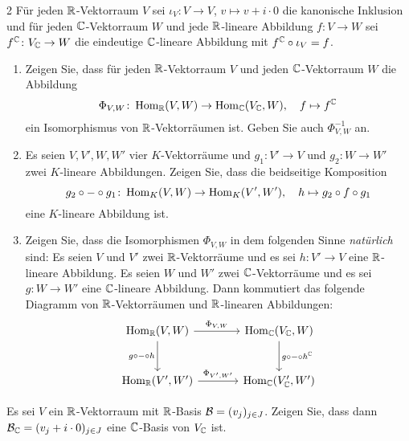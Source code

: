 

\begin{question}[subtitle = Komplexifizierung von Abbildungen und Natürlichkeit der Komplexifizierung]{2}
  Für jeden $\mathbb{R}$-Vektorraum $V$ sei $\iota_V \colon V \to V$, $v \mapsto v + i \cdot 0$ die kanonische Inklusion und für jeden $\mathbb{C}$-Vektorraum $W$ und jede $\mathbb{R}$-lineare Abbildung $f \colon V \to W$ sei $f^{\mathbb{C}} \colon V_{\mathbb{C}} \to W$ die eindeutige $\mathbb{C}$-lineare Abbildung mit $f^{\mathbb{C}} \circ \iota_V = f$.
  \begin{enumerate}[leftmargin=*]
    \item
      Zeigen Sie, dass für jeden $\mathbb{R}$-Vektorraum $V$ und jeden $\mathbb{C}$-Vektorraum $W$ die Abbildung
      \[
        \Phi_{V,W} \colon \operatorname{Hom}_{\mathbb{R}}(V, W) \to \operatorname{Hom}_{\mathbb{C}}(V_{\mathbb{C}}, W),
        \quad
        f \mapsto f^{\mathbb{C}}
      \]
      ein Isomorphismus von $\mathbb{R}$-Vektorräumen ist.
      Geben Sie auch $\Phi_{V,W}^{-1}$ an.
    \item
      Es seien  $V, V', W, W'$ vier $K$-Vektorräume und $g_1 \colon V' \to V$ und $g_2 \colon W \to W'$ zwei $K$-lineare Abbildungen.
      Zeigen Sie, dass die beidseitige Komposition
      \[
        g_2 \circ - \circ g_1
        \colon
        \operatorname{Hom}_K(V, W) \to \operatorname{Hom}_K(V', W'),
        \quad
        h \mapsto g_2 \circ f \circ g_1
      \]
      eine $K$-lineare Abbildung ist.
    \item
      Zeigen Sie, dass die Isomorphismen $\Phi_{V,W}$ in dem folgenden Sinne \emph{natürlich} sind:
      Es seien $V$ und $V'$ zwei $\mathbb{R}$-Vektorräume und es sei $h \colon V' \to V$ eine $\mathbb{R}$-lineare Abbildung.
      Es seien $W$ und $W'$ zwei $\mathbb{C}$-Vektorräume und es sei $g \colon W \to W'$ eine $\mathbb{C}$-lineare Abbildung.
      Dann kommutiert das folgende Diagramm von $\mathbb{R}$-Vektorräumen und $\mathbb{R}$-linearen Abbildungen:
      \[
        \begin{tikzcd}[row sep = large, column sep = large, ampersand replacement=\&]
                \Hom_\Rbb(V, W)         \arrow[swap]{d}{g \circ - \circ h}
                                        \arrow{r}{\Phi_{V,W}}
            \&  \Hom_\Cbb(V_\Cbb, W)    \arrow{d}{g \circ - \circ h^\Cbb}
          \\
                \Hom_\Rbb(V', W')       \arrow{r}{\Phi_{V',W'}}
            \&  \Hom_\Cbb(V'_\Cbb, W')
        \end{tikzcd}
      \]
  \end{enumerate}
\end{question}


\begin{question}[subtitle = Komplexifizierung von Basen]{2}
  Es sei $V$ ein $\mathbb{R}$-Vektorraum mit $\mathbb{R}$-Basis $\mathcal{B} = (v_j)_{j \in J}$.
  Zeigen Sie, dass dann $\mathcal{B}_{\mathbb{C}} = (v_j + i \cdot 0)_{j \in J}$ eine $\mathbb{C}$-Basis von $V_{\mathbb{C}}$ ist.
\end{question}


